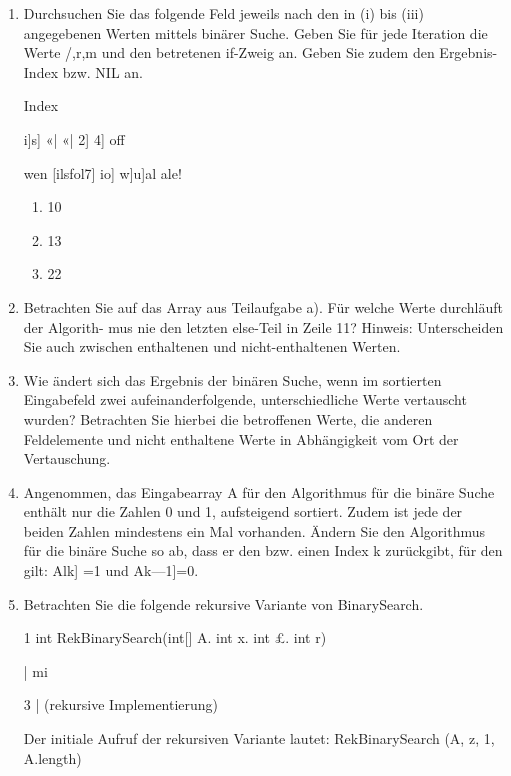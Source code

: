 \documentclass{lehramt-informatik-aufgabe}
\begin{document}
\begin{enumerate}


\item Durchsuchen Sie das folgende Feld jeweils nach den in (i) bis
(iii) angegebenen Werten mittels binärer Suche. Geben Sie für jede
Iteration die Werte /,r,m und den betretenen if-Zweig an. Geben Sie
zudem den Ergebnis-Index bzw. NIL an.

Index

i]s] «| «| 2] 4] off

wen [ilsfol7] io] w]u]al ale!
\begin{enumerate}

\item 10

\item 13

\item 22
\end{enumerate}


\item Betrachten Sie auf das Array aus Teilaufgabe a). Für welche Werte
durchläuft der Algorith- mus nie den letzten else-Teil in Zeile 11?
Hinweis: Unterscheiden Sie auch zwischen enthaltenen und
nicht-enthaltenen Werten.


\item Wie ändert sich das Ergebnis der binären Suche, wenn im sortierten
Eingabefeld zwei aufeinanderfolgende, unterschiedliche Werte
vertauscht wurden? Betrachten Sie hierbei die betroffenen Werte, die
anderen Feldelemente und nicht enthaltene Werte in Abhängigkeit vom Ort
der Vertauschung.


\item Angenommen, das Eingabearray A für den Algorithmus für die binäre
Suche enthält nur die Zahlen 0 und 1, aufsteigend sortiert. Zudem ist
jede der beiden Zahlen mindestens ein Mal vorhanden. Ändern Sie den
Algorithmus für die binäre Suche so ab, dass er den bzw. einen Index k
zurückgibt, für den gilt: Alk] =1 und Ak—1]=0.


\item Betrachten Sie die folgende rekursive Variante von BinarySearch.

1 int RekBinarySearch(int[] A. int x. int £. int r)

| mi

3 | (rekursive Implementierung)

Der initiale Aufruf der rekursiven Variante lautet:
RekBinarySearch (A, z, 1, A.length)
\end{enumerate}
\end{document}
